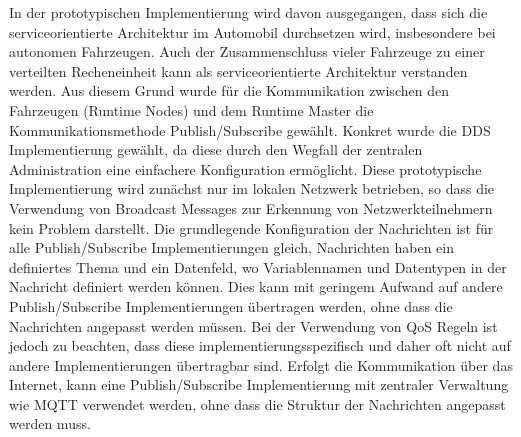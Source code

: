 In der prototypischen Implementierung wird davon ausgegangen, dass sich die serviceorientierte Architektur im Automobil durchsetzen wird, insbesondere bei autonomen Fahrzeugen. Auch der Zusammenschluss vieler Fahrzeuge zu einer verteilten Recheneinheit kann als serviceorientierte Architektur verstanden werden. Aus diesem Grund wurde für die Kommunikation zwischen den Fahrzeugen (Runtime Nodes) und dem Runtime Master die Kommunikationsmethode Publish/Subscribe gewählt. Konkret wurde die \gls{DDS} Implementierung gewählt, da diese durch den Wegfall der zentralen Administration eine einfachere Konfiguration ermöglicht. Diese prototypische Implementierung wird zunächst nur im lokalen Netzwerk betrieben, so dass die Verwendung von Broadcast Messages zur Erkennung von Netzwerkteilnehmern kein Problem darstellt. Die grundlegende Konfiguration der Nachrichten ist für alle Publish/Subscribe Implementierungen gleich, Nachrichten haben ein definiertes Thema und ein Datenfeld, wo Variablennamen und Datentypen in der Nachricht definiert werden können. Dies kann mit geringem Aufwand auf andere Publish/Subscribe Implementierungen übertragen werden, ohne dass die Nachrichten angepasst werden müssen. Bei der Verwendung von \gls{QoS} Regeln ist jedoch zu beachten, dass diese implementierungsspezifisch und daher oft nicht auf andere Implementierungen übertragbar sind. Erfolgt die Kommunikation über das Internet, kann eine Publish/Subscribe Implementierung mit zentraler Verwaltung wie \gls{MQTT} verwendet werden, ohne dass die Struktur der Nachrichten angepasst werden muss. 

